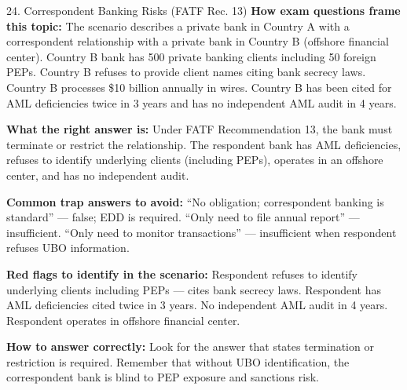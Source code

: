 \documentclass[11pt,a4paper]{beamer}
\begin{document}
	\begin{frame}{24. Correspondent Banking Risks (FATF Rec. 13)}
		\tiny
		\noindent\textbf{How exam questions frame this topic:} The scenario describes a private bank in Country A with a correspondent relationship with a private bank in Country B (offshore financial center). Country B bank has 500 private banking clients including 50 foreign PEPs. Country B refuses to provide client names citing bank secrecy laws. Country B processes \$10 billion annually in wires. Country B has been cited for AML deficiencies twice in 3 years and has no independent AML audit in 4 years.
		
		\vspace{0.1cm}
		\noindent\textbf{What the right answer is:} Under FATF Recommendation 13, the bank must terminate or restrict the relationship. The respondent bank has AML deficiencies, refuses to identify underlying clients (including PEPs), operates in an offshore center, and has no independent audit.
		
		\vspace{0.1cm}
		\noindent\textbf{Common trap answers to avoid:} “No obligation; correspondent banking is standard” — false; EDD is required. “Only need to file annual report” — insufficient. “Only need to monitor transactions” — insufficient when respondent refuses UBO information.
		
		\vspace{0.1cm}
		\noindent\textbf{Red flags to identify in the scenario:} Respondent refuses to identify underlying clients including PEPs — cites bank secrecy laws. Respondent has AML deficiencies cited twice in 3 years. No independent AML audit in 4 years. Respondent operates in offshore financial center.
		
		\vspace{0.1cm}
		\noindent\textbf{How to answer correctly:} Look for the answer that states termination or restriction is required. Remember that without UBO identification, the correspondent bank is blind to PEP exposure and sanctions risk.
	\end{frame}
	
\end{document}
